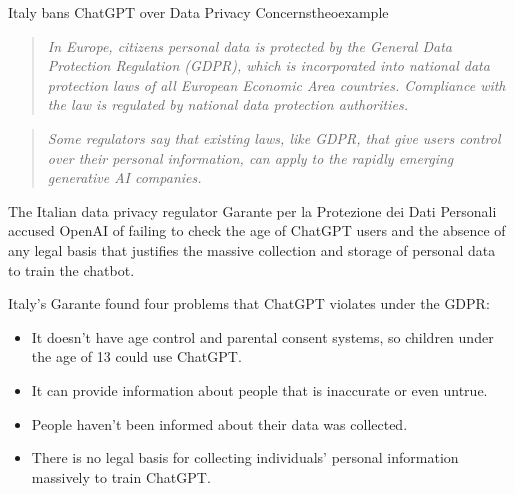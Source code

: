 \documentclass{article}
\begin{document}
\begin{mytheo}{Italy bans ChatGPT over Data Privacy Concerns}{theoexample}
    \begin{quote}
    \textit{In Europe, citizens personal data is protected by the General Data Protection 
            Regulation (GDPR), which is incorporated into national data protection laws 
            of all European Economic Area countries. Compliance with the law is 
            regulated by national data protection authorities.}
    \end{quote}

    \begin{quote}
      \textit{Some regulators say that existing laws, like GDPR, that give users control over their personal information, can apply to the rapidly emerging generative AI companies.}
    \end{quote}

    The Italian data privacy regulator Garante per la Protezione dei Dati Personali accused OpenAI 
    of failing to check the age of ChatGPT users and the absence of any legal basis that justifies 
    the massive collection and storage of personal data to train the chatbot.
    
    Italy’s Garante found four problems that ChatGPT violates under the GDPR:
    \begin{itemize}
      \item It doesn’t have age control and parental consent systems, so children under the age of 13 could use ChatGPT.
      \item It can provide information about people that is inaccurate or even untrue.
      \item People haven’t been informed about their data was collected.
      \item There is no legal basis for collecting individuals’ personal information massively to train ChatGPT.
    \end{itemize}

\end{mytheo}
\end{document}
